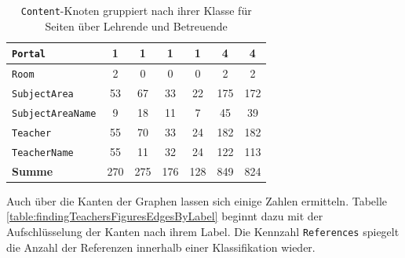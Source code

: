 \begin{table}[htb]
\begin{tabular}{|l|c|c|c|c|c|c|}
            \texttt{Portal}             & 1                                  & 1                                   & 1                                    & 1                                  & 4                                   & 4                                  \\ \hline
            \texttt{Room}               & 2                                  & 0                                   & 0                                    & 0                                  & 2                                   & 2                                  \\ \hline
            \texttt{SubjectArea}        & 53                                 & 67                                  & 33                                   & 22                                 & 175                                 & 172                                \\ \hline
            \texttt{SubjectAreaName}    & 9                                  & 18                                  & 11                                   & 7                                  & 45                                  & 39                                 \\ \hline
            \texttt{Teacher}            & 55                                 & 70                                  & 33                                   & 24                                 & 182                                 & 182                                \\ \hline
            \texttt{TeacherName}        & 55                                 & 11                                  & 32                                   & 24                                 & 122                                 & 113                                \\ \hline
            \hline
            \textbf{Summe}     & 270                                & 275                                 & 176                                  & 128                                & 849                                 & 824                                \\ \hline
        \end{tabular}
        \caption{\texttt{Content}-Knoten gruppiert nach ihrer Klasse für Seiten über Lehrende und Betreuende}
        \label{table:findingsTeachersFiguresContentNodesByClass}
    \end{table}

    Auch über die Kanten der Graphen lassen sich einige Zahlen ermitteln.
    Tabelle \ref{table:findingTeachersFiguresEdgesByLabel} beginnt dazu
    mit der Aufschlüsselung der Kanten nach ihrem Label.
    Die Kennzahl \texttt{References} spiegelt die Anzahl der Referenzen innerhalb einer Klassifikation wieder.


